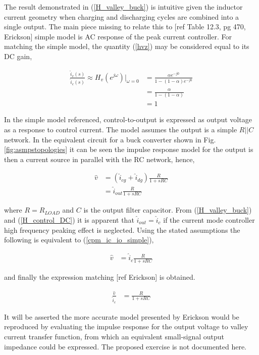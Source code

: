 \documentclass[conference]{IEEEtran}
\begin{document}
The result demonstrated in (\ref{H_valley_buck}) is intuitive given the inductor current geometry when charging and discharging cycles are combined into a single output.  The main piece missing to relate this to [ref Table 12.3, pg 470, Erickson] simple model is AC response of the peak current controller. For matching the simple model, the quantity (\ref{hvz}) may be considered equal to its DC gain,

\begin{align}
	\frac{\hat{i}_v(s)} {\hat{i}_c(s)} \approx H_v(e^{j\omega}) \bigg|_{\omega=0} &= \frac{\alpha e^{-j0}}{1- (1-\alpha) e^{-j0}} \nonumber \\
	&= \frac{\alpha}{1 - (1-\alpha)} \nonumber \\
	&= 1
	\label{H_control_DC}
\end{align}

In the simple model referenced, control-to-output is expressed as output voltage as a response to control current.  The model assumes the output is a simple $R||C$ network.  In the equivalent circuit for a buck converter shown in Fig. \ref{fig:asmpstopologies} it can be seen the impulse response model for the output is then a current source in parallel with the RC network, hence,

\begin{align}
	\hat{v} &= (\hat{i}_{cg} + \hat{i}_{dg})\frac{R}{1 + sRC} \nonumber \\
	&= \hat{i}_{out}\frac{R}{1 + sRC}
	\label{cpm_ic_io_simple}
\end{align}

where $R=R_{LOAD}$ and $C$ is the output filter capacitor. From (\ref{H_valley_buck}) and (\ref{H_control_DC}) it is apparent that $\hat{i}_{out} = \hat{i}_c$ if the current mode controller high frequency peaking effect is neglected.  Using the stated assumptions the following is equivalent to (\ref{cpm_ic_io_simple}),

\begin{align}
\hat{v} &= \hat{i}_{c}\frac{R}{1 + sRC}
\end{align}

and finally the expression matching [ref Erickson] is obtained.

\begin{align}
\frac{\hat{v}}{\hat{i}_{c}} &= \frac{R}{1 + sRC}
\end{align}

It will be asserted the more accurate model presented by Erickson would be reproduced by evaluating the impulse response for the output voltage to valley current transfer function, from which an equivalent small-signal output impedance could be expressed. The proposed exercise is not documented here. 
\end{document}
